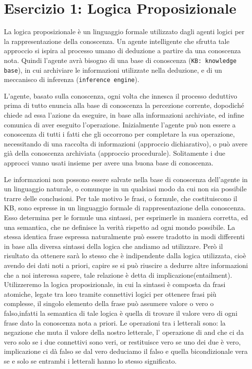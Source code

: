 \raggedright
{}
	\label{ch:cc}
	\section{Esercizio 1: Logica Proposizionale}
		\label{sec:es1}
		La logica proposizionale è un linguaggio formale utilizzato dagli agenti logici per la rappresentazione della conoscenza. Un agente intelligente che sfrutta tale approccio si ispira al processo umano di deduzione a partire da una conoscenza nota. Quindi l'agente avrà bisogno di una base di conoscenza (\texttt{KB: knowledge base}), in cui archiviare le informazioni utilizzate nella deduzione, e di un meccanisco di inferenza (\texttt{inference engine}).
		\par
		L'agente, basato sulla conoscenza, ogni volta che innesca il processo deduttivo prima di tutto enuncia alla base di conoscenza la percezione corrente, dopodiché chiede ad essa l'azione da eseguire, in base alla informazioni archiviate, ed infine comunica  di aver eseguito l'operazione. Inizialmente l'agente può non essere a conoscenza di tutti i fatti che gli occorrono per completare la sua operazione, necessitando di una raccolta di informazioni (approccio dichiarativo), o può avere già della conoscenza archiviata (approccio procedurale). Solitamente i due approcci vanno usati insieme per avere una buona base di conoscenza.
		\par
		Le informazioni non possono essere salvate nella base di conoscenza dell'agente in un linguaggio naturale, o comunque in un qualsiasi modo da cui non sia possibile trarre delle conclusioni. Per tale motivo le frasi, o formule, che costituiscono il KB, sono espresse in un linguaggio formale di rappresentazione della conoscenza. Esso determina per le formule una sintassi, per esprimerle in maniera corretta, ed una semantica, che ne definisce la verità rispetto ad ogni mondo possibile. La stessa identica frase espressa naturalmente può essere tradotto in modi differenti in base alla diversa sintassi della logica che andiamo ad utilizzare. Però il risultato da ottenere sarà lo stesso che è indipendente dalla logica utilizzata, cioè avendo dei dati noti a priori, capire se si può riuscire a dedurre altre informazioni che a noi interessa sapere, tale relazione è detta di implicazione(entailment). Utilizzeremo la logica proposizionale, in cui la sintassi è composta da frasi atomiche, legate tra loro tramite connettivi logici per ottenere frasi più complesse, il singolo elemento della frase può assumere valore o vero o falso,infatti la semantica di tale logica è quella di trovare il valore vero di ogni frase dato la conoscenza nota a priori. Le operazioni tra i letterali sono: la negazione che muta il valore della nostro letterale, l' operazione di and che ci da vero solo se i due connettivi sono veri, or restituisce vero se uno dei due è vero, implicazione ci dà falso se dal vero deduciamo il falso e quella bicondizionale vera se e solo se entrambi i letterali hanno lo stesso significato.
